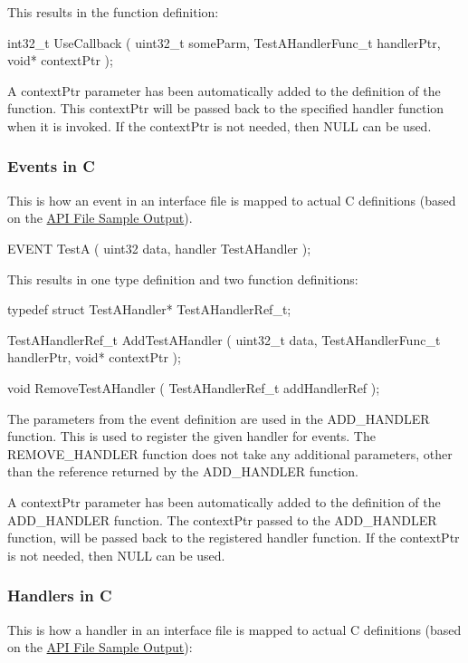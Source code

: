 This results in the function definition\+:

\begin{DoxyVerb}int32_t UseCallback
(
    uint32_t someParm,
    TestAHandlerFunc_t handlerPtr,
    void* contextPtr
);
\end{DoxyVerb}


A {\ttfamily context\+Ptr} parameter has been automatically added to the definition of the function. This {\ttfamily context\+Ptr} will be passed back to the specified handler function when it is invoked. If the {\ttfamily context\+Ptr} is not needed, then N\+U\+L\+L can be used.\hypertarget{interface_def_lang_c_interfaceDefLangC_event}{}\subsubsection{Events in C}\label{interface_def_lang_c_interfaceDefLangC_event}
This is how an event in an interface file is mapped to actual C definitions (based on the \hyperlink{interface_def_lang_c_interfaceDefLangC_sampleAPI}{A\+P\+I File Sample Output}).

\begin{DoxyVerb}EVENT TestA
(
    uint32 data,
    handler TestAHandler
);
\end{DoxyVerb}


This results in one type definition and two function definitions\+:

\begin{DoxyVerb}typedef struct TestAHandler* TestAHandlerRef_t;

TestAHandlerRef_t AddTestAHandler
(
    uint32_t data,
    TestAHandlerFunc_t handlerPtr,
    void* contextPtr
);

void RemoveTestAHandler
(
    TestAHandlerRef_t addHandlerRef
);
\end{DoxyVerb}


The parameters from the event definition are used in the A\+D\+D\+\_\+\+H\+A\+N\+D\+L\+E\+R function. This is used to register the given handler for events. The R\+E\+M\+O\+V\+E\+\_\+\+H\+A\+N\+D\+L\+E\+R function does not take any additional parameters, other than the reference returned by the A\+D\+D\+\_\+\+H\+A\+N\+D\+L\+E\+R function.

A {\ttfamily context\+Ptr} parameter has been automatically added to the definition of the A\+D\+D\+\_\+\+H\+A\+N\+D\+L\+E\+R function. The {\ttfamily context\+Ptr} passed to the A\+D\+D\+\_\+\+H\+A\+N\+D\+L\+E\+R function, will be passed back to the registered handler function. If the {\ttfamily context\+Ptr} is not needed, then N\+U\+L\+L can be used.\hypertarget{interface_def_lang_c_interfaceDefLangC_handler}{}\subsubsection{Handlers in C}\label{interface_def_lang_c_interfaceDefLangC_handler}
This is how a handler in an interface file is mapped to actual C definitions (based on the \hyperlink{interface_def_lang_c_interfaceDefLangC_sampleAPI}{A\+P\+I File Sample Output})\+:

